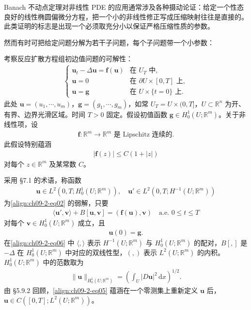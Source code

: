 \documentclass[../../main.tex]{subfiles}
\begin{document}
Banach 不动点定理对非线性 PDE 的应用通常涉及各种摄动论证：给定一个性态良好的线性椭圆偏微分方程，把一个小的非线性修正写成压缩映射往往是直接的。此类证明的标志是出现一个必须取充分小以保证严格压缩性质的参数。

然而有时可把给定问题分解为若干子问题，每个子问题带一个小参数：

\begin{example}[反应扩散方程]\label{example:ch09-2-1-反应扩散}
考察反应扩散方程组初边值问题的可解性：
\begin{align}
\begin{cases}
\mathbf{u}_t-\Delta\mathbf{u}=\mathbf{f}(\mathbf{u})&\text{在 }U_T\text{ 中},\\
\mathbf{u}=0&\text{在 }\partial U\times[0,T]\text{ 上},\\
\mathbf{u}=\mathbf{g}&\text{在 }U\times\{t=0\}\text{ 上}.
\end{cases}\label{align:ch09-2-eq02}
\end{align}
此处 $\mathbf{u}=(u_1,\cdots,u_m)$，$\mathbf{g}=(g_1,\cdots,g_m)$，如常 $U_T=U\times(0,T]$，$U\subset\mathbb{R}^n$ 为开、有界、边界光滑区域。时间 $T>0$ 固定。假设初值函数 $\mathbf{g}\in H_0^1(U;\mathbb{R}^m)$。关于非线性项，设
\begin{align}
\mathbf{f}:\mathbb{R}^m\to\mathbb{R}^m\text{ 是 Lipschitz 连续的}.\label{align:ch09-2-eq03}
\end{align}
此假设特别蕴涵
\begin{align}
|\mathbf{f}(z)|\leqslant C(1+|z|)\label{align:ch09-2-eq04}
\end{align}
对每个 $z\in\mathbb{R}^m$ 及某常数 $C$。

采用 \S7.1 的术语，称函数
\begin{align}
\mathbf{u}\in L^2(0,T;H_0^1(U;\mathbb{R}^m)),\quad \mathbf{u}'\in L^2(0,T;H^{-1}(U;\mathbb{R}^m))\label{align:ch09-2-eq05}
\end{align}
为\eqref{align:ch09-2-eq02} 的弱解，只要
\begin{align}
\langle\mathbf{u}',\mathbf{v}\rangle+B[\mathbf{u},\mathbf{v}]=(\mathbf{f}(\mathbf{u}),\mathbf{v})\quad\text{a.e. }0\leqslant t\leqslant T\label{align:ch09-2-eq06}
\end{align}
对每个 $\mathbf{v}\in H_0^1(U;\mathbb{R}^m)$ 成立，且
\begin{align}
\mathbf{u}(0)=\mathbf{g}.\label{align:ch09-2-eq07}
\end{align}
在\eqref{align:ch09-2-eq06} 中 $\langle,\rangle$ 表示 $H^{-1}(U;\mathbb{R}^m)$ 与 $H_0^1(U;\mathbb{R}^m)$ 的配对，$B[,]$ 是 $-\Delta$ 在 $H_0^1(U;\mathbb{R}^m)$ 中对应的双线性型，$(,)$ 表示 $L^2(U;\mathbb{R}^m)$ 的内积。$H_0^1(U;\mathbb{R}^m)$ 中的范数取为
\begin{align*}
\|\mathbf{u}\|_{H_0^1(U;\mathbb{R}^m)}=\left(\int_U|D\mathbf{u}|^2\,\mathrm{d}x\right)^{1/2}.
\end{align*}
由 \S5.9.2 回顾，\eqref{align:ch09-2-eq05} 蕴涵在一个零测集上重新定义 $\mathbf{u}$ 后，$\mathbf{u}\in C([0,T];L^2(U;\mathbb{R}^m))$。


\end{example}
\end{document}
